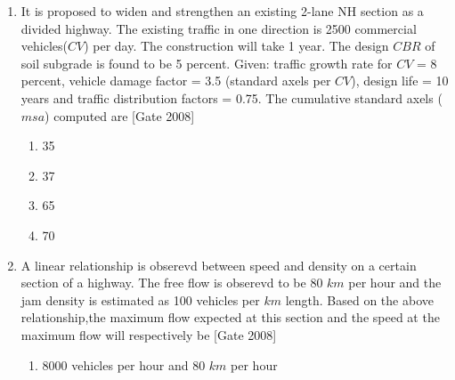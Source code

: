 \documentclass[journal]{IEEEtran}
\begin{document}
\begin{enumerate}
\begin{figure}[h]
{\begin{tikzpicture}
    
\end{tikzpicture}}
\end{figure}

		The critical lane volume on the major road changes to 440 vehicles per hour per lane and the critical lane volume on the minor road remains unchanged. The green time will \hfill [Gate 2008]
\begin{multicols}{2}
	\begin{enumerate}
		\item increase for the major road and remain same for the minor road
		\item increase for the major road and decrease for the minor road

		\item decrease for both the roads
		\item remain unchanged for both the roads
	\end{enumerate}
\end{multicols}
	\item It is proposed to widen and strengthen an existing 2-lane NH section as a divided highway. The existing traffic in one direction is 2500 commercial vehicles($CV$) per day. The construction will take 1 year. The design $CBR$ of soil subgrade is found to be 5 percent. Given: traffic growth rate for $CV$ = 8 percent, vehicle damage factor = 3.5 (standard axels per $CV$), design life = 10 years and traffic distribution factors = 0.75. The cumulative standard axels ($msa$) computed are \hfill [Gate 2008]
\begin{multicols}{4}
	\begin{enumerate}
		\item 35
		\item 37
		\item 65
		\item 70
	\end{enumerate}
\end{multicols}	
	\item A linear relationship is obserevd between speed and density on a certain section of a highway. The free flow is obserevd to be 80 $km$ per hour and the jam density is estimated as 100 vehicles per $km$ length. Based on the above relationship,the maximum flow expected at this section and the speed at the maximum flow will respectively be \hfill [Gate 2008]
\begin{multicols}{2} 
	\begin{enumerate}
		\item 8000 vehicles per hour and 80 $km$ per hour

\end{enumerate}
\end{multicols}
\end{enumerate}
\end{document}
